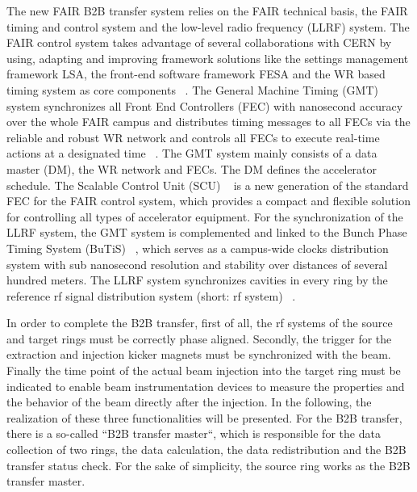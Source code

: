 The new FAIR B2B transfer system relies on the FAIR technical basis, the FAIR timing and control system and the low-level radio frequency (LLRF) system. The FAIR control system takes advantage of several collaborations with CERN by using, adapting and improving framework solutions like the settings management framework LSA, the front-end software framework FESA and the WR based timing system as core components ~\cite{huhmann_fair_2013}. The General Machine Timing (GMT) system synchronizes all Front End Controllers (FEC) with nanosecond accuracy over the whole FAIR campus and distributes timing messages to all FECs via the reliable and robust WR network and controls all FECs to execute real-time actions at a designated time ~\cite{beck_new_2012}. The GMT system mainly consists of a data master (DM), the WR network and FECs. The DM defines the accelerator schedule. The Scalable Control Unit (SCU) ~\cite{kaiser_f-tn-c-008e_2014} is a new generation of the standard FEC for the FAIR control system, which provides a compact and flexible solution for controlling all types of accelerator equipment. For the synchronization of the LLRF system, the GMT system is complemented and linked to the Bunch Phase Timing System (BuTiS) ~\cite{moritz_butisdevelopment_2006, moritz_f-cs-rf-14e_2012}, which serves as a campus-wide clocks distribution system with sub nanosecond resolution and stability over distances of several hundred meters. The LLRF system synchronizes cavities in every ring by the reference rf signal distribution system (short: rf system) ~\cite{klingbeil_detailed_2013}. 

In order to complete the B2B transfer, first of all, the rf systems of the source and target rings must be correctly phase aligned. Secondly, the trigger for the extraction and injection kicker magnets must be synchronized with the beam. Finally the time point of the actual beam injection into the target ring must be indicated to enable beam instrumentation devices to measure the properties and the behavior of the beam directly after the injection. In the following, the realization of these three functionalities will be presented. For the B2B transfer, there is a so-called “B2B transfer master“, which is responsible for the data collection of two rings, the data calculation, the data redistribution and the B2B transfer status check. For the sake of simplicity, the source ring works as the B2B transfer master.

